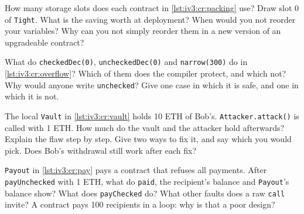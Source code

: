 \begin{question}\label{iq:iv3:smart-contracts-and-crypto-engineering:8}
How many storage slots does each contract in \cref{lst:iv3:cr:packing} use? Draw slot 0 of \texttt{Tight}. What is the saving worth at deployment? When would you not reorder your variables? Why can you not simply reorder them in a new version of an upgradeable contract?
\label{lst:iv3:cr:packing}
\end{question}

\begin{question}\label{iq:iv3:smart-contracts-and-crypto-engineering:9}
What do \texttt{checkedDec(0)}, \texttt{uncheckedDec(0)} and \texttt{narrow(300)} do in \cref{lst:iv3:cr:overflow}? Which of them does the compiler protect, and which not? Why would anyone write \texttt{unchecked}? Give one case in which it is safe, and one in which it is not.
\label{lst:iv3:cr:overflow}
\end{question}

\begin{question}\label{iq:iv3:smart-contracts-and-crypto-engineering:10}
The local \texttt{Vault} in \cref{lst:iv3:cr:vault} holds 10 ETH of Bob's. \texttt{Attacker.attack()} is called with 1 ETH. How much do the vault and the attacker hold afterwards? Explain the flaw step by step. Give two ways to fix it, and say which you would pick. Does Bob's withdrawal still work after each fix?
\label{lst:iv3:cr:vault}
\end{question}

\begin{question}\label{iq:iv3:smart-contracts-and-crypto-engineering:11}
\texttt{Payout} in \cref{lst:iv3:cr:pay} pays a contract that refuses all payments. After \texttt{payUnchecked} with 1 ETH, what do \texttt{paid}, the recipient's balance and \texttt{Payout}'s balance show? What does \texttt{payChecked} do? What other faults does a raw \texttt{call} invite? A contract pays 100 recipients in a loop: why is that a poor design?
\label{lst:iv3:cr:pay}
\end{question}

